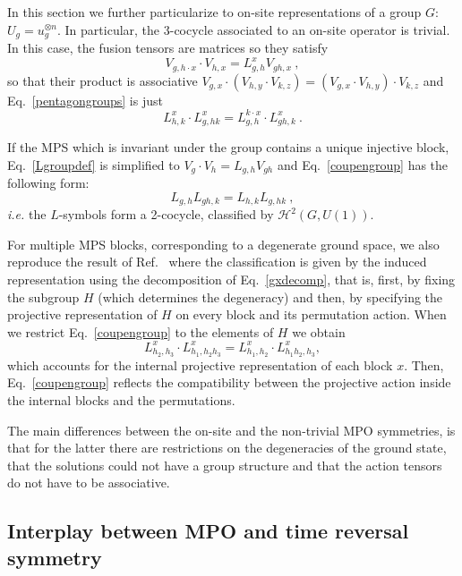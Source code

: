 \documentclass[a4paper,twocolumn,11pt,accepted=2023-02-10]{quantumarticle}
\begin{document}
In this section we further particularize to on-site  representations of a group $G$: $U_g=u^{\otimes n}_g$. In particular, the $3$-cocycle associated to an on-site operator is trivial. In this case, the fusion tensors are matrices so they satisfy
\begin{equation}\label{Lgroupdef}
V_{g,h{\cdot} x} \cdot V_{h, x}  = {L}_{g,h}^{x} V_{gh, x}\ ,
 \end{equation}
so that their product is associative $V_{g,x}{\cdot}(V_{h,y} {\cdot} V_{k,z})= (V_{g,x}{\cdot} V_{h,y}){\cdot} V_{k,z}$
and Eq.\ \eqref{pentagongroups} is just
\begin{equation}\label{coupengroup}
{L}_{h,k}^{x} \cdot {L}_{g,hk}^{x}
 = {L}_{g,h}^{k{\cdot} x} \cdot  {L}_{gh,k}^{x} \ .
 \end{equation}

If the MPS which is invariant under the group contains a unique injective block, Eq.\ \eqref{Lgroupdef} is simplified to $V_{g}{\cdot} V_{h} = {L}_{g,h} V_{gh}$ 
and Eq.\ \eqref{coupengroup} has the following form: 
$${L}_{g,h}{L}_{gh,k}= {L}_{h,k}{L}_{g,hk}\ ,$$
{\it i.e.} the ${L}$-symbols form a 2-cocycle, classified by $\mathcal{H}^2(G,U(1))$.

For multiple MPS blocks, corresponding to a degenerate ground space, we also reproduce the result of Ref.\ \cite{Schuch11} where the classification is given by the induced representation using the decomposition of Eq.\ \eqref{gxdecomp}, that is,  first, by fixing the subgroup $H$ (which determines the degeneracy) and then, by specifying the projective representation of $H$ on every block and its permutation action. When we restrict Eq.\ \eqref{coupengroup} to the elements of $H$ we obtain
$${L}^x_{h_2,h_3} {\cdot} {L}^x_{h_1,h_2h_3}  
=  {L}^x_{h_1,h_2} {\cdot} {L}^x_{h_1h_2,h_3},$$
which accounts for the internal projective representation of each block $x$. Then, Eq.\ \eqref{coupengroup} reflects the compatibility between the projective action inside the internal blocks and the permutations.

The main differences between the on-site and the non-trivial MPO symmetries, is that for the latter there are restrictions on the degeneracies of the ground state, that the solutions could not have a group structure and that the action tensors do not have to be associative.

\subsection{Interplay between MPO and time reversal symmetry}\label{sec:TRS}
\end{document}
